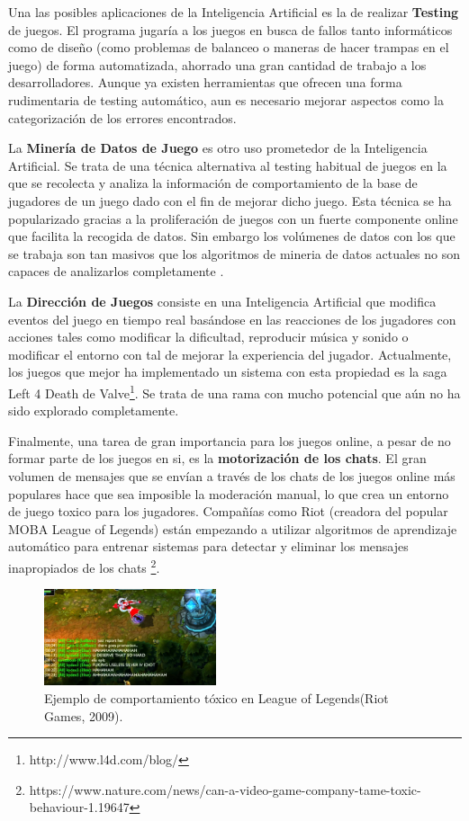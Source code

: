 Una las posibles aplicaciones de la Inteligencia Artificial es la de realizar \textbf{Testing} de juegos. El programa jugaría a los juegos en busca de fallos tanto informáticos como de diseño (como problemas de balanceo o maneras de hacer trampas en el juego) de forma automatizada, ahorrado una gran cantidad de trabajo a los desarrolladores. Aunque ya existen herramientas que ofrecen una forma rudimentaria de testing automático, aun es necesario mejorar aspectos como la categorización de los errores encontrados.

La \textbf{Minería de Datos de Juego} es otro uso prometedor de la Inteligencia Artificial. Se trata de una técnica alternativa al testing habitual de juegos en la que se recolecta y analiza la información de comportamiento de la base de jugadores de un juego dado con el fin de mejorar dicho juego\cite{ai_revisited}. Esta técnica se ha popularizado gracias a la proliferación de juegos con un fuerte componente online que facilita la recogida de datos. Sin embargo los volúmenes de datos con los que se trabaja son tan masivos que los algoritmos de mineria de datos actuales no son capaces de analizarlos completamente \cite{ai_revisited}.

La \textbf{Dirección de Juegos} consiste en una Inteligencia Artificial que modifica eventos del juego en tiempo real basándose en las reacciones de los jugadores con acciones tales como modificar la dificultad, reproducir música y sonido o modificar el entorno con tal de mejorar la experiencia del jugador. Actualmente, los juegos que mejor ha implementado un sistema con esta propiedad es la saga Left 4 Death de Valve\footnote{http://www.l4d.com/blog/}. Se trata de una rama con mucho potencial que aún no ha sido explorado completamente.

Finalmente, una tarea de gran importancia para los juegos online, a pesar de no formar parte de los juegos en si, es la \textbf{motorización de los chats}. El gran volumen de mensajes que se envían a través de los chats de los juegos online más populares hace que sea imposible la moderación manual, lo que crea un entorno de juego toxico para los jugadores. Compañías como Riot (creadora del popular MOBA League of Legends) están empezando a utilizar algoritmos de aprendizaje automático para entrenar sistemas para detectar y eliminar los mensajes inapropiados de los chats \footnote{https://www.nature.com/news/can-a-video-game-company-tame-toxic-behaviour-1.19647}.

\begin{figure}[h]
	\includegraphics[width=0.45\textwidth]{images/estadodelarte/ai/lol-toxic-capture}
	\centering
	\caption{Ejemplo de comportamiento tóxico en League of Legends(Riot Games, 2009).}
\end{figure}